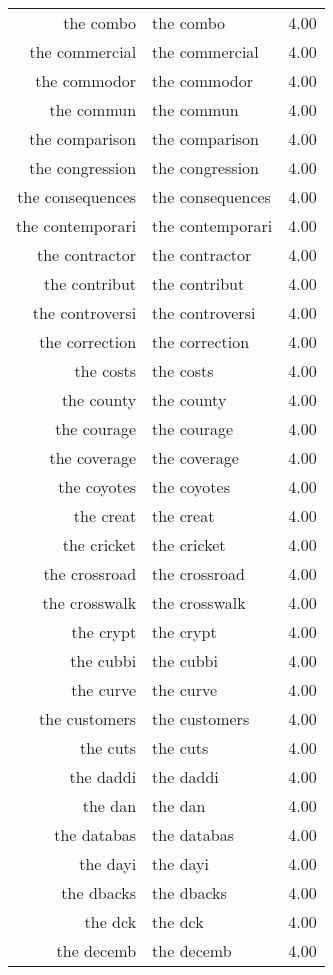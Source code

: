 \begin{table}[ht]
\begin{tabular}{rlr}
  the combo & the combo & 4.00 \\ 
  the commercial & the commercial & 4.00 \\ 
  the commodor & the commodor & 4.00 \\ 
  the commun & the commun & 4.00 \\ 
  the comparison & the comparison & 4.00 \\ 
  the congression & the congression & 4.00 \\ 
  the consequences & the consequences & 4.00 \\ 
  the contemporari & the contemporari & 4.00 \\ 
  the contractor & the contractor & 4.00 \\ 
  the contribut & the contribut & 4.00 \\ 
  the controversi & the controversi & 4.00 \\ 
  the correction & the correction & 4.00 \\ 
  the costs & the costs & 4.00 \\ 
  the county & the county & 4.00 \\ 
  the courage & the courage & 4.00 \\ 
  the coverage & the coverage & 4.00 \\ 
  the coyotes & the coyotes & 4.00 \\ 
  the creat & the creat & 4.00 \\ 
  the cricket & the cricket & 4.00 \\ 
  the crossroad & the crossroad & 4.00 \\ 
  the crosswalk & the crosswalk & 4.00 \\ 
  the crypt & the crypt & 4.00 \\ 
  the cubbi & the cubbi & 4.00 \\ 
  the curve & the curve & 4.00 \\ 
  the customers & the customers & 4.00 \\ 
  the cuts & the cuts & 4.00 \\ 
  the daddi & the daddi & 4.00 \\ 
  the dan & the dan & 4.00 \\ 
  the databas & the databas & 4.00 \\ 
  the dayi & the dayi & 4.00 \\ 
  the dbacks & the dbacks & 4.00 \\ 
  the dck & the dck & 4.00 \\ 
  the decemb & the decemb & 4.00 \\ 

\end{tabular}
\end{table}

